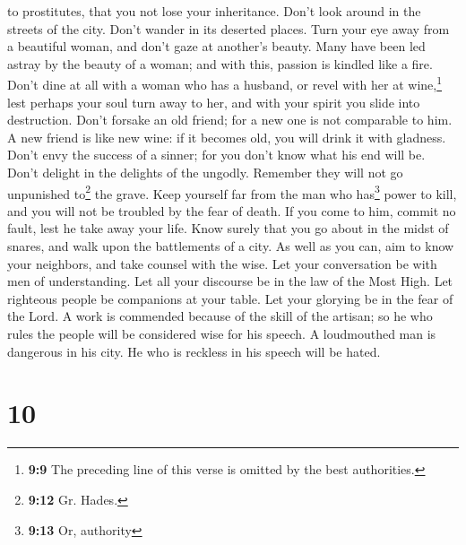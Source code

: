to prostitutes, that you not lose your inheritance.  Don't
look around in the streets of the city. Don't wander in its deserted
places.  Turn your eye away from a beautiful woman, and
don't gaze at another's beauty. Many have been led astray by the beauty
of a woman; and with this, passion is kindled like a fire.
 Don't dine at all with a woman who has a husband, or
revel with her at wine,\footnote{\textbf{9:9} The preceding line of this
  verse is omitted by the best authorities.} lest perhaps your soul turn
away to her, and with your spirit you slide into destruction.
 Don't forsake an old friend; for a new one is not
comparable to him. A new friend is like new wine: if it becomes old, you
will drink it with gladness.  Don't envy the success of a
sinner; for you don't know what his end will be.  Don't
delight in the delights of the ungodly. Remember they will not go
unpunished to\footnote{\textbf{9:12} Gr. Hades.} the grave.
 Keep yourself far from the man who has\footnote{\textbf{9:13}
  Or, authority} power to kill, and you will not be troubled by the fear
of death. If you come to him, commit no fault, lest he take away your
life. Know surely that you go about in the midst of snares, and walk
upon the battlements of a city.  As well as you can, aim
to know your neighbors, and take counsel with the wise. 
Let your conversation be with men of understanding. Let all your
discourse be in the law of the Most High.  Let righteous
people be companions at your table. Let your glorying be in the fear of
the Lord.  A work is commended because of the skill of
the artisan; so he who rules the people will be considered wise for his
speech.  A loudmouthed man is dangerous in his city. He
who is reckless in his speech will be hated.

\hypertarget{section-7}{%
\section{10}\label{section-7}}

